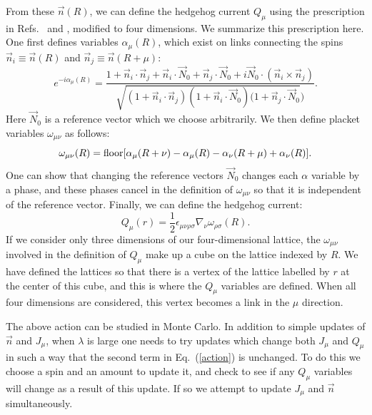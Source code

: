 \documentclass[prb,twocolumn]{revtex4-1}
\begin{document}
From these ${\vec{n}(R)}$, we can define the hedgehog current $Q_\mu$ using the prescription in Refs.~ and , modified to four dimensions. We summarize this prescription here. One first defines variables $\alpha_\mu(R)$, which exist on links connecting the spins $\vec{n}_i\equiv\vec n(R)$ and $\vec{n}_j\equiv\vec n(R+\mu)$:
\begin{equation}
e^{-i\alpha_{\mu}(R)}=\frac{1+\vec{n}_i\cdot\vec{n}_j+\vec{n}_i\cdot\vec{N}_0+\vec{n}_j\cdot\vec{N}_0+i\vec{N}_0 \cdot(\vec{n}_i\times\vec{n}_j)}{\sqrt{(1+\vec{n}_i\cdot\vec{n}_j)(1+\vec{n}_i\cdot\vec{N}_0)(1+\vec{n}_j\cdot\vec{N}_0})}.
\label{alpha}
\end{equation}
Here $\vec{N}_0$ is a reference vector which we choose arbitrarily. 
We then define placket variables $\omega_{\mu\nu}$ as follows:
\begin{equation}
\omega_{\mu\nu}(R)={\rm floor}[\alpha_\mu(R+\nu)-\alpha_\mu(R)-\alpha_\nu(R+\mu)+\alpha_\nu(R)].
\label{omega}
\end{equation}
One can show that changing the reference vectors $\vec{N}_0$ changes each $\alpha$ variable by a phase, and these phases cancel in the definition of $\omega_{\mu\nu}$ so that it is independent of the reference vector. Finally, we can define the hedgehog current:
\begin{equation}
Q_\mu(r)=\frac{1}{2}\epsilon_{\mu\nu\rho\sigma}\nabla_{\nu} \omega_{\rho\sigma}(R).
\label{monopoledef}
\end{equation}
If we consider only three dimensions of our four-dimensional lattice, the $\omega_{\mu\nu}$ involved in the definition of $Q_\mu$ make up a cube on the lattice indexed by $R$. We have defined the lattices so that there is a vertex of the lattice labelled by $r$ at the center of this cube, and this is where the $Q_\mu$ variables are defined. When all four dimensions are considered, this vertex becomes a link in the $\mu$ direction.  

The above action can be studied in Monte Carlo. In addition to simple updates of $\vec{n}$ and $J_\mu$, when $\lambda$ is large one needs to try updates which change both $J_\mu$ and $Q_\mu$ in such a way that the second term in Eq.~(\ref{action}) is unchanged. To do this we choose a spin and an amount to update it, and check to see if any $Q_\mu$ variables will change as a result of this update. If so we attempt to update $J_\mu$ and $\vec{n}$ simultaneously.
\end{document}

